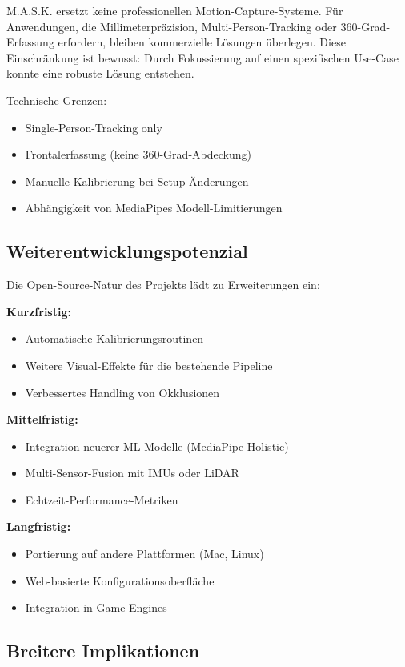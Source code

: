 M.A.S.K. ersetzt keine professionellen Motion-Capture-Systeme. Für Anwendungen, die Millimeterpräzision, Multi-Person-Tracking oder 360-Grad-Erfassung erfordern, bleiben kommerzielle Lösungen überlegen. Diese Einschränkung ist bewusst: Durch Fokussierung auf einen spezifischen Use-Case konnte eine robuste Lösung entstehen.

Technische Grenzen:
\begin{itemize}
    \item Single-Person-Tracking only
    \item Frontalerfassung (keine 360-Grad-Abdeckung)
    \item Manuelle Kalibrierung bei Setup-Änderungen
    \item Abhängigkeit von MediaPipes Modell-Limitierungen
\end{itemize}

\subsection{Weiterentwicklungspotenzial}

Die Open-Source-Natur des Projekts lädt zu Erweiterungen ein:

\textbf{Kurzfristig:}
\begin{itemize}
    \item Automatische Kalibrierungsroutinen
    \item Weitere Visual-Effekte für die bestehende Pipeline
    \item Verbessertes Handling von Okklusionen
\end{itemize}

\textbf{Mittelfristig:}
\begin{itemize}
    \item Integration neuerer ML-Modelle (MediaPipe Holistic)
    \item Multi-Sensor-Fusion mit IMUs oder LiDAR
    \item Echtzeit-Performance-Metriken
\end{itemize}

\textbf{Langfristig:}
\begin{itemize}
    \item Portierung auf andere Plattformen (Mac, Linux)
    \item Web-basierte Konfigurationsoberfläche
    \item Integration in Game-Engines
\end{itemize}

\subsection{Breitere Implikationen}

